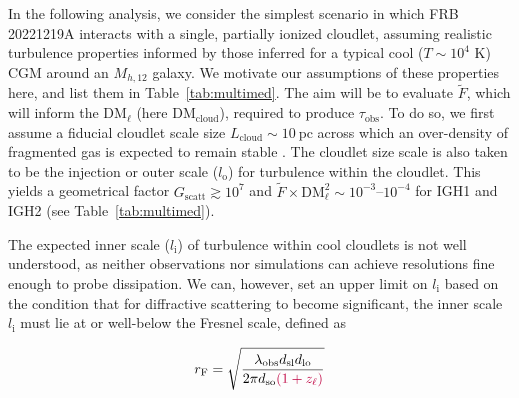 \documentclass[twocolumn, linenumbers, tra]{aastex631}
\newcommand{\rev}[1]{{\color{purple}#1}}
\newcommand{\nihari}{FRB\,20221219A } %
\begin{document}
{In the following analysis, we consider the simplest scenario in which \nihari interacts with a single, partially ionized cloudlet, assuming realistic turbulence properties informed by those inferred for a typical cool ($T \sim 10^{4}$ K) CGM around an $M_{h,12}$ galaxy. We motivate our assumptions of these properties here, and list them in Table~\ref{tab:multimed}. The aim will be to evaluate $\widetilde{F}$, which will inform the $\mathrm{DM}_{\ell}$ (here $\mathrm{DM_{\mathrm{cloud}}}$), required to produce $\tau_{\mathrm{obs}}$. To do so, we first assume a fiducial cloudlet scale size $L_\mathrm{cloud} \sim 10\ \mathrm{pc}$ across which an over-density of fragmented gas is expected to remain stable \citep{McCourt2018}. The cloudlet size scale is also taken to be the injection or outer scale ($l_\mathrm{o}$) for turbulence within the cloudlet. This yields a geometrical factor $G_{\mathrm{scatt}} \gtrsim 10^7$ and $\widetilde{F} \times \mathrm{DM}_{\ell}^2 \sim 10^{-3}$--$10^{-4}$ for IGH1 and IGH2 (see Table~\ref{tab:multimed}). 

The expected inner scale ($l_{\mathrm{i}}$) of turbulence within cool cloudlets is not well understood, as neither observations nor simulations can achieve resolutions fine enough to probe dissipation. We can, however, set an upper limit on $l_\mathrm{i}$ based on the condition that for diffractive scattering to become significant, the inner scale $l_\mathrm{i}$ must lie at or well-below the Fresnel scale, defined as}

\begin{equation}\label{eq:fresnel}
  r_{\mathrm{F}} = \sqrt{\frac{\lambda_{\mathrm{obs}} d_{\mathrm{sl}} d_{\mathrm{lo}}}{2 \pi d_{\mathrm{so}} \rev{(1+z_{\ell})}}}
\end{equation}
\end{document}
